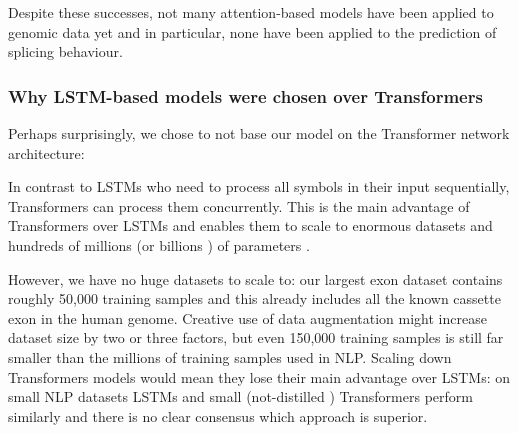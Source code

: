 
Despite these successes, not many attention-based models have been applied to genomic data yet and in particular, none have been applied to the prediction of splicing behaviour. 

\subsubsection{Why LSTM-based models were chosen over Transformers} \label{lstmvstransformer}
Perhaps surprisingly, we chose to not base our model on the Transformer network architecture:

In contrast to LSTMs who need to process all symbols in their input sequentially, Transformers can process them concurrently. This is the main advantage of Transformers over LSTMs and enables them to scale to enormous datasets and hundreds of millions (or billions \cite{gpt3}) of parameters \cite{allyouneed}.

However, we have no huge datasets to scale to: our largest exon dataset contains roughly 50,000 training samples and this already includes all the known cassette exon in the human genome. Creative use of data augmentation might increase dataset size by two or three factors, but even 150,000 training samples is still far smaller than the millions of training samples used in NLP. Scaling down Transformers models would mean they lose their main advantage over LSTMs: on small NLP datasets LSTMs and small (not-distilled \cite{distilbert}) Transformers perform similarly \cite{mogrifier}\cite{smalltransformerwin} and there is no clear consensus which approach is superior. 

